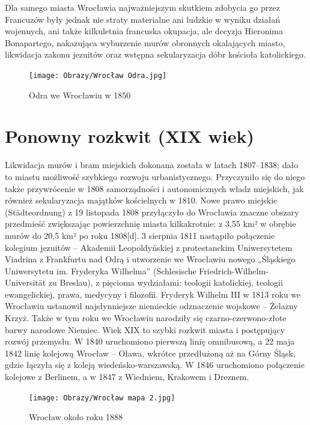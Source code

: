 \documentclass{article}
\begin{document}
Dla samego miasta Wrocławia najważniejszym skutkiem zdobycia go przez Francuzów były jednak nie straty materialne ani ludzkie w wyniku działań wojennych, ani także kilkuletnia francuska okupacja, ale decyzja Hieronima Bonapartego, nakazująca wyburzenie murów obronnych okalających miasto, likwidacja zakonu jezuitów oraz wstępna sekularyzacja dóbr kościoła katolickiego.
\begin{figure}[ht]
\centering
\texttt{[image: Obrazy/Wrocław Odra.jpg]}
\caption{Odra we Wrocławiu w 1850}
\label{fig:odra}
\end{figure}
\section{Ponowny rozkwit (XIX wiek)}
Likwidacja murów i bram miejskich dokonana została w latach 1807–1838; dało to miastu możliwość szybkiego rozwoju urbanistycznego. Przyczyniło się do niego także przywrócenie w 1808 samorządności i autonomicznych władz miejskich, jak również sekularyzacja majątków kościelnych w 1810. Nowe prawo miejskie (Städteordnung) z 19 listopada 1808 przyłączyło do Wrocławia znaczne obszary przedmieść zwiększając powierzchnię miasta kilkakrotnie: z 3,55 km² w obrębie murów do 20,5 km² po roku 1808[d]. 3 sierpnia 1811 nastąpiło połączenie kolegium jezuitów – Akademii Leopoldyńskiej z protestanckim Uniwersytetem Viadrina z Frankfurtu nad Odrą i utworzenie we Wrocławiu nowego „Śląskiego Uniwersytetu im. Fryderyka Wilhelma” (Schlesische Friedrich-Wilhelm-Universität zu Breslau), z pięcioma wydziałami: teologii katolickiej, teologii ewangelickiej, prawa, medycyny i filozofii. Fryderyk Wilhelm III w 1813 roku we Wrocławiu ustanowił najsłynniejsze niemieckie odznaczenie wojskowe – Żelazny Krzyż. Także w tym roku we Wrocławiu narodziły się czarno-czerwono-złote barwy narodowe Niemiec. Wiek XIX to szybki rozkwit miasta i postępujący rozwój przemysłu. W 1840 uruchomiono pierwszą linię omnibusową, a 22 maja 1842 linię kolejową Wrocław – Oława, wkrótce przedłużoną aż na Górny Śląsk, gdzie łączyła się z koleją wiedeńsko-warszawską. W 1846 uruchomiono połączenie kolejowe z Berlinem, a w 1847 z Wiedniem, Krakowem i Dreznem.
\begin{figure}[h!]
\centering
\begin{adjustwidth}{-.4in}{-.5in}  
\texttt{[image: Obrazy/Wrocław mapa 2.jpg]}
\end{adjustwidth}
\caption{Wrocław około roku 1888}
\label{fig:rozkwit}
\end{figure}
\newpage
\end{document}
